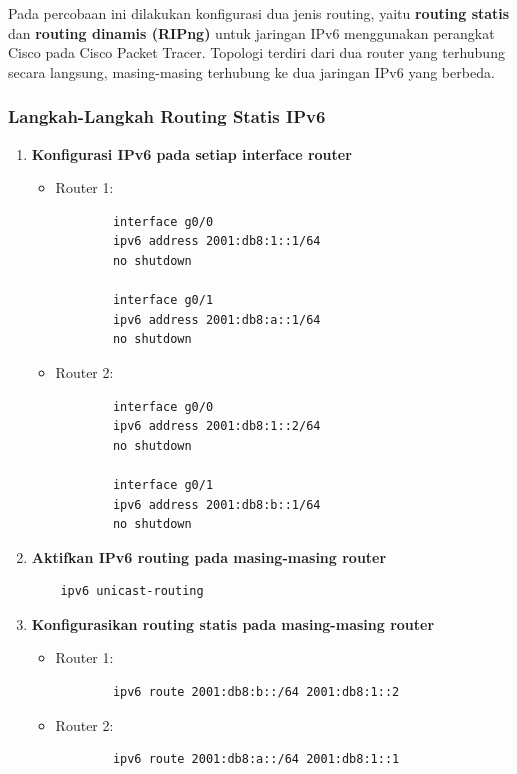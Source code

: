Pada percobaan ini dilakukan konfigurasi dua jenis routing, yaitu \textbf{routing statis} dan \textbf{routing dinamis (RIPng)} untuk jaringan IPv6 menggunakan perangkat Cisco pada Cisco Packet Tracer. Topologi terdiri dari dua router yang terhubung secara langsung, masing-masing terhubung ke dua jaringan IPv6 yang berbeda.

\subsubsection{Langkah-Langkah Routing Statis IPv6}

\begin{enumerate}
    \item \textbf{Konfigurasi IPv6 pada setiap interface router}
    \begin{itemize}
        \item Router 1:
        \begin{verbatim}
        interface g0/0
        ipv6 address 2001:db8:1::1/64
        no shutdown
        
        interface g0/1
        ipv6 address 2001:db8:a::1/64
        no shutdown
        \end{verbatim}

        \item Router 2:
        \begin{verbatim}
        interface g0/0
        ipv6 address 2001:db8:1::2/64
        no shutdown

        interface g0/1
        ipv6 address 2001:db8:b::1/64
        no shutdown
        \end{verbatim}
    \end{itemize}

    \item \textbf{Aktifkan IPv6 routing pada masing-masing router}
    \begin{verbatim}
    ipv6 unicast-routing
    \end{verbatim}

    \item \textbf{Konfigurasikan routing statis pada masing-masing router}
    \begin{itemize}
        \item Router 1:
        \begin{verbatim}
        ipv6 route 2001:db8:b::/64 2001:db8:1::2
        \end{verbatim}

        \item Router 2:
        \begin{verbatim}
        ipv6 route 2001:db8:a::/64 2001:db8:1::1
        \end{verbatim}
    \end{itemize}


\end{enumerate}

